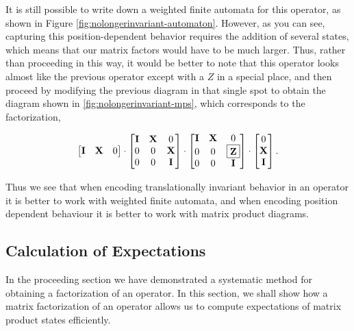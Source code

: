 \documentclass[12pt]{amsbook}
\theoremstyle{plain}
\theoremstyle{definition}
\theoremstyle{remark}
\begin{document}
It is still possible to write down a weighted finite automata for this operator, as shown in Figure \ref{fig:nolongerinvariant-automaton}.  However, as you can see, capturing this position-dependent behavior requires the addition of several states, which means that our matrix factors would have to be much larger.  Thus, rather than proceeding in this way, it would be better to note that this operator looks almost like the previous operator except with a $Z$ in a special place, and then proceed by modifying the previous diagram in that single spot to obtain the diagram shown in \ref{fig:nolongerinvariant-mps}, which corresponds to the factorization,

$$
\begin{bmatrix}
\textbf{I} & \textbf{X} & 0 \\
\end{bmatrix}
\cdot
\begin{bmatrix}
\textbf{I} & \textbf{X} & 0 \\
0 & 0 & \textbf{X} \\
0 & 0 & \textbf{I} \\
\end{bmatrix}
\cdot
\begin{bmatrix}
\textbf{I} & \textbf{X} & 0 \\
0 & 0 & \fbox{\textbf{Z}} \\
0 & 0 & \textbf{I} \\
\end{bmatrix}
\cdot
\begin{bmatrix}
0 \\
\textbf{X} \\
\textbf{I} \\
\end{bmatrix}.
$$

Thus we see that when encoding translationally invariant behavior in an operator it is better to work with weighted finite automata, and when encoding position dependent behaviour it is better to work with matrix product diagrams.
\subsection{Calculation of Expectations}

\label{calcexp}

In the proceeding section we have demonstrated a systematic method for obtaining a factorization of an operator.  In this section, we shall show how a matrix factorization of an operator allows us to compute expectations of matrix product states efficiently.
\end{document}
